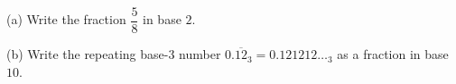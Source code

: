 (a) Write the fraction $\dfrac{5}{8}$ in base $2$.

(b) Write the repeating base-$3$ number $0.\overline{12}_3=0.121212\ldots_3$ as a fraction in base $10$.
